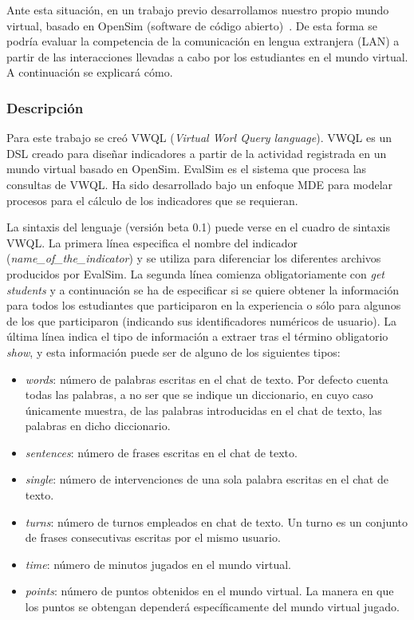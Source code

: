 		Ante esta situación, en un trabajo previo desarrollamos nuestro propio mundo virtual, basado en OpenSim (software de código abierto)~\cite{berns2013using}. De esta forma se podría evaluar la competencia de la comunicación en lengua extranjera (LAN) a partir de las interacciones llevadas a cabo por los estudiantes en el mundo virtual. A continuación se explicará cómo.

			\subsubsection*{Descripción}

			Para este trabajo se creó VWQL (\emph{Virtual Worl Query language}). VWQL es un DSL creado para diseñar indicadores a partir de la actividad registrada en un mundo virtual basado en OpenSim. EvalSim es el sistema que procesa las consultas de VWQL. Ha sido desarrollado bajo un enfoque MDE para modelar procesos para el cálculo de los indicadores que se requieran. 


			La sintaxis del lenguaje (versión beta 0.1) puede verse en el cuadro de sintaxis VWQL. La primera línea especifica el nombre del indicador (\emph{name\_of\_the\_indicator}) y se utiliza para diferenciar los diferentes archivos producidos por EvalSim. La segunda línea comienza obligatoriamente con \emph{get students} y a continuación se ha de especificar si se quiere obtener la información para todos los estudiantes que participaron en la experiencia o sólo para algunos de los que participaron (indicando sus identificadores numéricos de usuario). La última línea indica el tipo de información a extraer tras el término obligatorio \emph{show}, y esta información puede ser de alguno de los siguientes tipos:

\begin{itemize}
\item \emph{words}: número de palabras escritas en el chat de texto. Por defecto cuenta todas las palabras, a no ser que se indique un diccionario, en cuyo caso únicamente muestra, de las palabras introducidas en el chat de texto, las palabras en dicho diccionario.
\item \emph{sentences}: número de frases escritas en el chat de texto.
\item \emph{single}: número de intervenciones de una sola palabra escritas en el chat de texto.
\item \emph{turns}: número de turnos empleados en chat de texto. Un turno es un conjunto de frases consecutivas escritas por el mismo usuario.
\item \emph{time}: número de minutos jugados en el mundo virtual.
\item \emph{points}: número de puntos obtenidos en el mundo virtual. La manera en que los puntos se obtengan dependerá específicamente del mundo virtual jugado.
\end{itemize}

